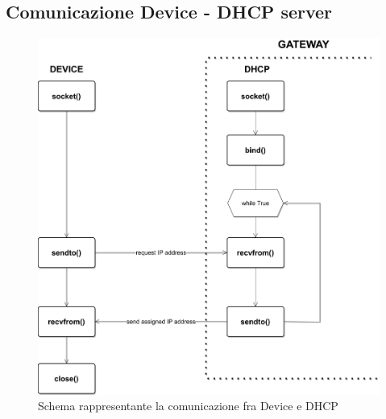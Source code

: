 \documentclass[a4paper,12pt]{report}
\begin{document}
\subsection{Comunicazione Device - DHCP server}
\begin{figure}[H]
    \begin{center}
        \centering
        \includegraphics[scale=0.5]{UML/DHCP.png}
    \end{center}
    \caption{Schema rappresentante la comunicazione fra Device e DHCP}
    \label{img:DHCP}
\end{figure}
\
\\
%
\end{document}
